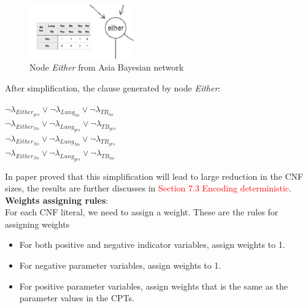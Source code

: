         \begin{figure}[h]
            \centering
            \includegraphics[width=0.4\textwidth]{pic/either01s.png}
            \caption{Node \textit{Either} from Asia Bayesian network}
            \label{fig:either01}
        \end{figure}
        
        \noindent After simplification, the clause generated by node \textit{Either}:\\
        \begin{center}
            $\neg \lambda_{Either_{yes}} \vee \neg \lambda_{Lung_{no}} \vee \neg  \lambda_{TB_{no}} $\\
            $\neg \lambda_{Either_{No}} \vee \neg \lambda_{Lung_{yes}} \vee \neg \lambda_{TB_{yes}}$\\
            $\neg \lambda_{Either_{No}} \vee \neg \lambda_{Lung_{No}} \vee \neg  \lambda_{TB_{yes}}$\\
            $\neg  \lambda_{Either_{No}} \vee \neg  \lambda_{Lung_{yes}} \vee \neg  \lambda_{TB_{no}}$
        \end{center}
        
        \noindent In paper \cite{enc2} proved that this simplification will lead to large reduction in the CNF sizes, the results are further discusses in \textcolor{red}{Section 7.3 Encoding deterministic}.\\
        
        \noindent \textbf{Weights assigning rules}:\\
        
        \noindent For each CNF literal, we need to assign a weight. These are the rules for assigning weights
        \begin{itemize}
            \item For both positive and negative indicator variables, assign weights to 1.
            \item For negative parameter variables, assign weights to 1.
            \item For positive parameter variables, assign weights that is the same as the parameter values in the CPTs.
        \end{itemize}
       
